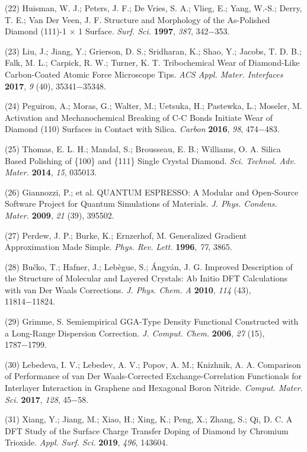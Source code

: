 \documentclass{article}
\begin{document}
\begin{hangpars}
(22) Huisman, W. J.; Peters, J. F.; De Vries, S. A.; Vlieg, E.; Yang, W.-S.; Derry, T. E.; Van Der Veen, J. F. Structure and Morphology of the As-Polished Diamond (111)-1 × 1 Surface. \textit{Surf. Sci.} \textbf{1997}, \textit{387}, 342−353.

(23) Liu, J.; Jiang, Y.; Grierson, D. S.; Sridharan, K.; Shao, Y.; Jacobs, T. D. B.; Falk, M. L.; Carpick, R. W.; Turner, K. T. Tribochemical Wear of Diamond-Like Carbon-Coated Atomic Force Microscope Tips. \textit{ACS Appl. Mater. Interfaces} \textbf{2017}, \textit{9} (40), 35341−35348.

(24) Peguiron, A.; Moras, G.; Walter, M.; Uetsuka, H.; Pastewka, L.; Moseler, M. Activation and Mechanochemical Breaking of C-C Bonds Initiate Wear of Diamond (110) Surfaces in Contact with Silica. \textit{Carbon} \textbf{2016}, \textit{98}, 474−483.

(25) Thomas, E. L. H.; Mandal, S.; Brousseau, E. B.; Williams, O. A. Silica Based Polishing of \{100\} and \{111\} Single Crystal Diamond. \textit{Sci. Technol. Adv. Mater.} \textbf{2014}, \textit{15}, 035013.

(26) Giannozzi, P.; et al. QUANTUM ESPRESSO: A Modular and Open-Source Software Project for Quantum Simulations of Materials. \textit{J. Phys. Condens. Mater.} \textbf{2009}, \textit{21} (39), 395502.

(27) Perdew, J. P.; Burke, K.; Ernzerhof, M. Generalized Gradient Approximation Made Simple. \textit{Phys. Rev. Lett.} \textbf{1996}, \textit{77}, 3865.

(28) Bučko, T.; Hafner, J.; Lebègue, S.; Ángyán, J. G. Improved Description of the Structure of Molecular and Layered Crystals: Ab Initio DFT Calculations with van Der Waals Corrections. \textit{J. Phys. Chem. A} \textbf{2010}, \textit{114} (43), 11814−11824.

(29) Grimme, S. Semiempirical GGA-Type Density Functional Constructed with a Long-Range Dispersion Correction. \textit{J. Comput. Chem.} \textbf{2006}, \textit{27} (15), 1787−1799.

(30) Lebedeva, I. V.; Lebedev, A. V.; Popov, A. M.; Knizhnik, A. A. Comparison of Performance of van Der Waals-Corrected Exchange-Correlation Functionals for Interlayer Interaction in Graphene and Hexagonal Boron Nitride. \textit{Comput. Mater. Sci.} \textbf{2017}, \textit{128}, 45−58.

(31) Xiang, Y.; Jiang, M.; Xiao, H.; Xing, K.; Peng, X.; Zhang, S.; Qi, D. C. A DFT Study of the Surface Charge Transfer Doping of Diamond by Chromium Trioxide. \textit{Appl. Surf. Sci.} \textbf{2019}, \textit{496}, 143604.


\end{hangpars}
\end{document}
